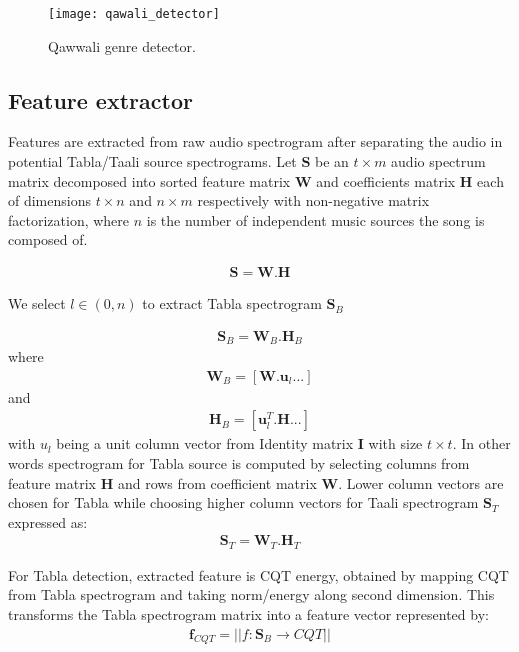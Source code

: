 \documentclass{article}
\begin{document}
\begin{figure}[htbp]
  \centering
  \texttt{[image: qawali\_detector]}
  \caption{Qawwali genre detector.}
\label{fig:block_dia}
\end{figure}

\subsection{Feature extractor}

Features are extracted from raw audio spectrogram after separating the audio in potential Tabla/Taali source spectrograms. Let $\boldsymbol{S}$ be an ${t\times  m}$ audio spectrum matrix decomposed into sorted feature matrix $\boldsymbol{W}$ and coefficients matrix $\boldsymbol{H}$ each of dimensions ${t\times n}$ and ${n\times m}$ respectively with non-negative matrix factorization, where $n$ is the number of independent music sources the song is composed of.

\begin{align}\label{eq:eq1}
\boldsymbol{S} = \boldsymbol{W}.\boldsymbol{H}
\end{align}

We select $l \in (0,n)$ to extract Tabla spectrogram $\boldsymbol{S}_{B}$ 

\begin{align}\label{eq:eq2}
\boldsymbol{S}_{B} = \boldsymbol{W}_{B}.\boldsymbol{H}_{B}
\end{align}
where
\begin{align}\label{eq:eq3}
\boldsymbol{W}_{B} = [\boldsymbol{W}.\boldsymbol{u}_{l} ...]
\end{align}
and 
\begin{align}\label{eq:eq4}
\boldsymbol{H}_{B} = [\boldsymbol{u}_{l}^T.\boldsymbol{H} ...]
\end{align}
with $u_{l}$ being a unit column vector from Identity matrix $\boldsymbol{I}$ with size ${t\times t}$. In other words spectrogram for Tabla source is computed
by selecting columns from feature matrix $\boldsymbol{H}$ and rows from coefficient matrix $\boldsymbol{W}$. Lower column vectors are chosen for Tabla while choosing higher column vectors for Taali spectrogram $\boldsymbol{S}_{T}$ expressed as:
\begin{align}\label{eq:eq5}
\boldsymbol{S}_{T} = \boldsymbol{W}_{T}.\boldsymbol{H}_{T}
\end{align}

For Tabla detection, extracted feature is CQT energy, obtained by mapping CQT from Tabla spectrogram and taking norm/energy along second dimension. This transforms the Tabla spectrogram matrix into a feature vector represented by:
\begin{align}\label{eq:eq6}
\boldsymbol{f}_{CQT} = \lvert \lvert f\colon \boldsymbol{S}_{B}\to CQT \rvert \rvert
\end{align}
\end{document}

